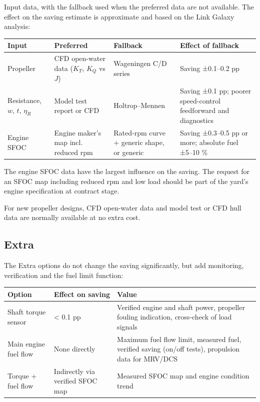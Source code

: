 \documentclass[a4paper,11pt]{article}
\begin{document}
Input data, with the fallback used when the preferred data are not
available.  The effect on the saving estimate is approximate and based on
the Link Galaxy analysis:

\begin{center}
\small
\begin{tabular}{p{2.6cm}p{4.0cm}p{3.6cm}p{4.6cm}}
Input & Preferred & Fallback & Effect of fallback\\[0pt]
\hline
Propeller & CFD open-water data (\(K_T\), \(K_Q\) vs \(J\)) & Wageningen C/D series & Saving ±0.1--0.2 pp\\[0pt]
Resistance, \(w\), \(t\), \(\eta_R\) & Model test report or CFD & Holtrop--Mennen & Saving ±0.1 pp; poorer speed-control feedforward and diagnostics\\[0pt]
Engine SFOC & Engine maker's map incl. reduced rpm & Rated-rpm curve + generic shape, or generic & Saving ±0.3--0.5 pp or more; absolute fuel ±5--10 \%\\[0pt]
\end{tabular}
\end{center}

The engine SFOC data have the largest influence on the saving.  The
request for an SFOC map including reduced rpm and low load should be
part of the yard's engine specification at contract stage.

For new propeller designs, CFD open-water data and model test or CFD
hull data are normally available at no extra cost.

\subsection{Extra}
\label{sec:org39e3462}

The Extra options do not change the saving significantly, but add
monitoring, verification and the fuel limit function:

\begin{center}
\small
\begin{tabular}{p{3.2cm}p{3.2cm}p{8.4cm}}
Option & Effect on saving & Value\\[0pt]
\hline
Shaft torque sensor & < 0.1 pp & Verified engine and shaft power, propeller fouling indication, cross-check of load signals\\[0pt]
Main engine fuel flow & None directly & Maximum fuel flow limit, measured fuel, verified saving (on/off tests), propulsion data for MRV/DCS\\[0pt]
Torque + fuel flow & Indirectly via verified SFOC map & Measured SFOC map and engine condition trend\\[0pt]
\end{tabular}
\end{center}
\end{document}

